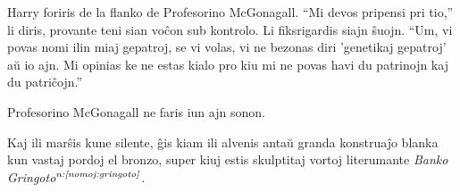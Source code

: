 Harry foriris de la flanko de Profesorino McGonagall. ``Mi devos
pripensi pri tio,'' li diris, provante teni sian voĉon sub
kontrolo. Li fiksrigardis siajn ŝuojn. ``Um, vi povas nomi ilin miaj
gepatroj, se vi volas, vi ne bezonas diri 'genetikaj gepatroj' aŭ io
ajn. Mi opinias ke ne estas kialo pro kiu mi ne povas havi du
patrinojn kaj du patriĉojn.''

Profesorino McGonagall ne faris iun ajn sonon.

Kaj ili marŝis kune silente, ĝis kiam ili alvenis antaŭ granda
konstruaĵo blanka kun vastaj pordoj el bronzo, super kiuj estis
skulptitaj vortoj literumante \emph{Banko
  Gringoto$^{\textit{n:\ref{nomoj:gringoto}}}$.}
